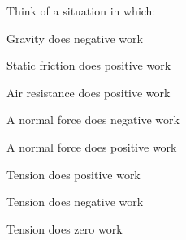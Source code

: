 \documentclass[12pt]{article}
\begin{document}
\Large
\centerline{}

\normalsize
\centerline{}



Think of a situation in which:

\vspace{0.3in}


\begin{minipage}{0.5\textwidth}	
	\begin{center}
		Gravity does negative work
	\end{center}
\end{minipage}
\begin{minipage}{0.5\textwidth}	
		\begin{center}
	Static friction does positive work
		\end{center}
\end{minipage}


\vspace{1.2in}


\begin{minipage}{0.5\textwidth}	
		\begin{center}
	Air resistance does positive work
		\end{center}
\end{minipage}
\begin{minipage}{0.5\textwidth}	
		\begin{center}
	A normal force does negative work
		\end{center}
\end{minipage}


\vspace{1.2in}


\begin{minipage}{0.5\textwidth}	
		\begin{center}
	A normal force does positive work
		\end{center}
\end{minipage}
\begin{minipage}{0.5\textwidth}	
		\begin{center}
	Tension does positive work
		\end{center}
\end{minipage}

\vspace{1.2in}

\begin{minipage}{0.5\textwidth}	
		\begin{center}
	Tension does negative work
		\end{center}
\end{minipage}
\begin{minipage}{0.5\textwidth}	
		\begin{center}
	Tension does zero work
		\end{center}
\end{minipage}
\end{document}

